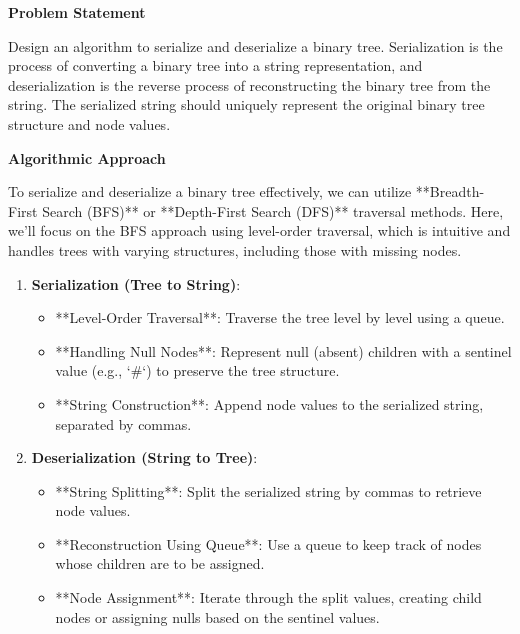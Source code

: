 

\textbf{Problem Statement}

Design an algorithm to serialize and deserialize a binary tree. Serialization is the process of converting a binary tree into a string representation, and deserialization is the reverse process of reconstructing the binary tree from the string. The serialized string should uniquely represent the original binary tree structure and node values.

\textbf{Algorithmic Approach}

To serialize and deserialize a binary tree effectively, we can utilize **Breadth-First Search (BFS)** or **Depth-First Search (DFS)** traversal methods. Here, we'll focus on the BFS approach using level-order traversal, which is intuitive and handles trees with varying structures, including those with missing nodes.

\begin{enumerate}
    \item \textbf{Serialization (Tree to String)}:
    \begin{itemize}
        \item **Level-Order Traversal**: Traverse the tree level by level using a queue.
        \item **Handling Null Nodes**: Represent null (absent) children with a sentinel value (e.g., `\#`) to preserve the tree structure.
        \item **String Construction**: Append node values to the serialized string, separated by commas.
    \end{itemize}
    
    \item \textbf{Deserialization (String to Tree)}:
    \begin{itemize}
        \item **String Splitting**: Split the serialized string by commas to retrieve node values.
        \item **Reconstruction Using Queue**: Use a queue to keep track of nodes whose children are to be assigned.
        \item **Node Assignment**: Iterate through the split values, creating child nodes or assigning nulls based on the sentinel values.
    \end{itemize}
\end{enumerate}

